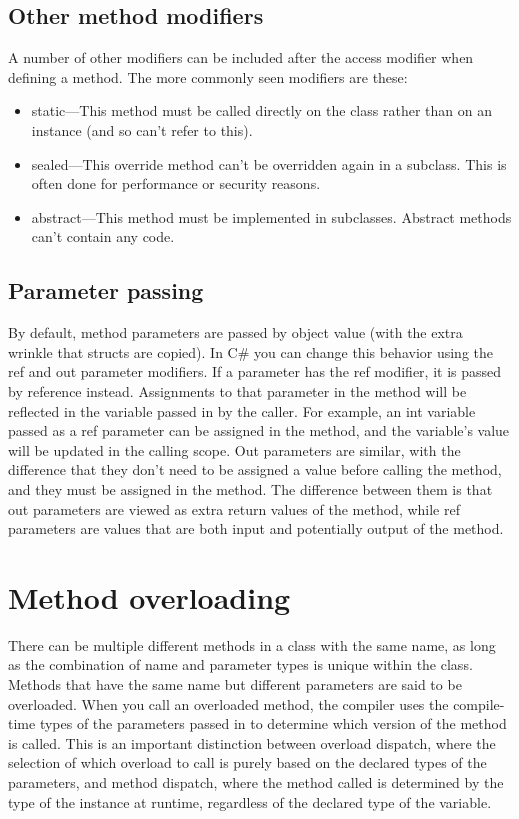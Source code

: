 \documentclass[12pt,a4paper,final,twoside,titlepage]{book}
\begin{document}
\subsection{Other method modifiers}
A number of other modifiers can be included after the access modifier when defining a method. The more commonly seen modifiers are these:
\begin{itemize}
\item static—This method must be called directly on the class rather than on an instance (and so can’t refer to this).
\item sealed—This override method can’t be overridden again in a subclass. This is often done for performance or security reasons.
\item abstract—This method must be implemented in subclasses. Abstract methods can’t contain any code.
\end{itemize}
\subsection{Parameter passing}
By default, method parameters are passed by object value (with the extra wrinkle that structs are copied).
In C\# you can change this behavior using the ref and out parameter modifiers. If a parameter has the ref modifier, it is passed by reference instead. Assignments to that parameter in the method will be reflected in the variable passed in by the caller. For example, an int variable passed as a ref parameter can be assigned in the method, and the variable’s value will be updated in the calling scope. Out parameters are similar, with the difference that they don’t need to be assigned a value before calling the method, and they must be assigned in the method. The difference between them is that out parameters are viewed as extra return values of the method, while ref parameters are values that are both input and potentially output of the method.
\section{Method overloading}
There can be multiple different methods in a class with the same name, as long as the combination of name and parameter types is unique within the class. Methods that have the same name but different parameters are said to be overloaded. When you call an overloaded method, the compiler uses the compile-time types of the parameters passed in to determine which version of the method is called. This is an important distinction between overload dispatch, where the selection of which overload to call is purely based on the declared types of the parameters, and method dispatch, where the method called is determined by the type of the instance at runtime, regardless of the declared type of the variable.
\end{document}

